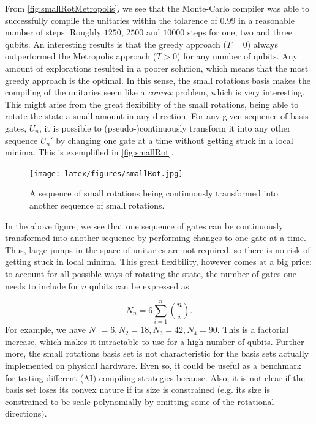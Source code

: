\documentclass{article}
\begin{document}
From \autoref{fig:smallRotMetropolis}, we see that the Monte-Carlo compiler was able to successfully compile the unitaries within the tolarence of $0.99$ in a reasonable number of steps: Roughly $1250$, $2500$ and $10000$ steps for one, two and three qubits. An interesting results is that the greedy approach ($T=0$) always outperformed the Metropolis approach ($T>0$) for any number of qubits. Any amount of explorations resulted in a poorer solution, which means that the most greedy approach is the optimal. In this sense, the small rotations basis makes the compiling of the unitaries seem like a \emph{convex} problem, which is very interesting. This might arise from the great flexibility of the small rotations, being able to rotate the state a small amount in any direction. For any given sequence of basis gates, $U_n$, it is possible to (pseudo-)continuously transform it into any other sequence $U_n'$ by changing one gate at a time without getting stuck in a local minima. This is exemplified in \autoref{fig:smallRot}.  


\begin{figure}[h]
\texttt{[image: latex/figures/smallRot.jpg]}
\caption{A sequence of small rotations being continuously transformed into another sequence of small rotations.}
\label{fig:smallRot}
\end{figure}
In the above figure, we see that one sequence of gates can be continuously transformed into another sequence by performing changes to one gate at a time. Thus, large jumps in the space of unitaries are not required, so there is no risk of getting stuck in local minima. This great flexibility, however comes at a big price: to account for all possible ways of rotating the state, the number of gates one needs to include for $n$ qubits can be expressed as 

\begin{equation}\label{eq:smallRot}
    N_n = 6\sum_{i=1}^{n}{{n}\choose{i}}.
\end{equation}
For example, we have $N_1 = 6, N_2 = 18, N_3 = 42, N_4 = 90$. This is a factorial increase, which makes it intractable to use for a high number of qubits. Further more, the small rotations basis set is not characteristic for the basis sets actually implemented on physical hardware. Even so, it could be useful as a benchmark for testing different (AI) compiling strategies because. Also, it is not clear if the basis set loses its convex nature if its size is constrained (e.g. its size is constrained to be scale polynomially by omitting some of the rotational directions).\\
\end{document}
